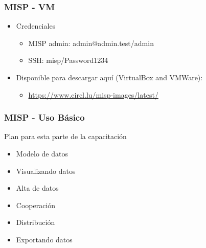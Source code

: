 


\begin{frame}[t,plain]
\titlepage
\end{frame}

\begin{frame}
    \frametitle{MISP - VM}
    \begin{itemize}
    \item Credenciales
        \begin{itemize}
            \item MISP admin: admin@admin.test/admin
            \item SSH: misp/Password1234
        \end{itemize}
    \item Disponible para descargar aquí (VirtualBox and VMWare):
        \begin{itemize}
                \item \url{https://www.circl.lu/misp-images/latest/}
        \end{itemize}
    \end{itemize}
\end{frame}

\begin{frame}
    \frametitle{MISP - Uso Básico}
    Plan para esta parte de la capacitación
        \begin{itemize}
            \item Modelo de datos
            \item Visualizando datos
            \item Alta de datos
            \item Cooperación
            \item Distribución
            \item Exportando datos
        \end{itemize}
\end{frame}

